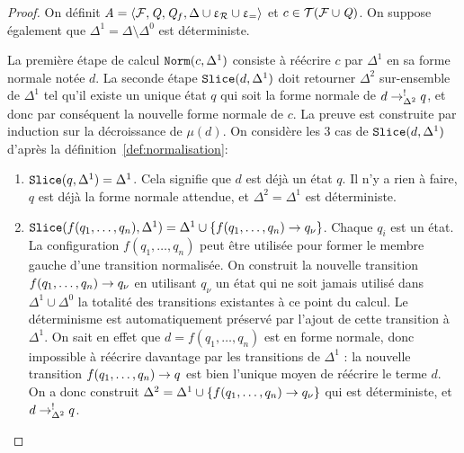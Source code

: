 \begin{proof}
  On définit $\mathit A = \langle \mathcal{F}, \mathit Q, \mathit Q_f, \Delta \cup \upvarepsilon_{\mathcal R} \cup \upvarepsilon_{=}\rangle$ et $c \in \mathcal{ T(F \cup \mathit Q)}$.
  On suppose également que $\Delta^1 = \Delta \setminus \Delta^0$ est déterministe.

  La première étape de calcul $\mathtt{Norm}(c, \Delta^1)$ consiste à réécrire $c$ par
  $\Delta^1$ en sa forme normale notée $d$.
  La seconde étape $\mathtt{Slice}(d, \Delta^1)$ doit retourner $\Delta^2$ sur-ensemble de $\Delta^1$
  tel qu'il existe un unique état $q$ qui soit la forme normale de $d \rightarrow^!_{\Delta^2} q$, et donc 
  par conséquent la nouvelle forme normale de $c$.
  La preuve est construite par induction sur la décroissance de $\mu(d)$.
  On considère les 3 cas de $\mathtt{Slice}(d, \Delta^1)$ d'après la définition~\ref{def:normalisation}:
   
  \begin{enumerate}
  \item $\mathtt{Slice}(q, \Delta^1) = \Delta^1$. Cela signifie que $d$ est déjà un état $q$. 
    Il n'y a rien à faire, $q$ est déjà la forme normale attendue, et $\Delta^2 = \Delta^1$ est déterministe.

  \item $\mathtt{Slice}(f(q_1, \dots, q_n), \Delta^1) = \Delta^1 \cup \{ f(q_1, \dots, q_n) \rightarrow q_\nu\}$. 
    Chaque $q_i$ est un état. La configuration $f(q_1, \dots, q_n)$ peut être utilisée pour former le membre gauche d'une transition
    normalisée. On construit la nouvelle transition $f(q_1, \dots, q_n) \rightarrow q_\nu$ en utilisant $q_\nu$ un état qui ne soit jamais 
    utilisé dans $\Delta^1 \cup \Delta^0$ la totalité des transitions existantes à ce point du calcul.
    Le déterminisme est automatiquement préservé par l'ajout de cette transition à $\Delta^1$. On sait en effet
    que $d = f(q_1, \dots, q_n)$ est en forme normale, donc impossible à réécrire davantage par les transitions de 
    $\Delta^1$ : la nouvelle transition $f(q_1, \dots, q_n) \rightarrow q$ est bien l'unique moyen de réécrire le terme $d$. On a donc construit
    $\Delta^2 = \Delta^1 \cup \{ f(q_1, \dots, q_n) \rightarrow q_\nu\}$ qui est déterministe, et $d \rightarrow^!_{\Delta^2} q$.
     

\end{enumerate}
\end{proof}
